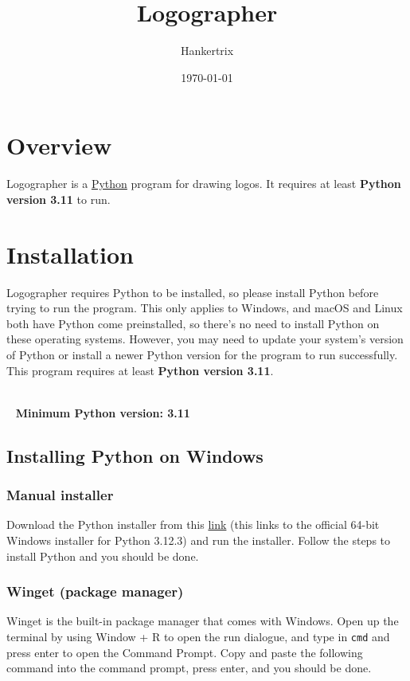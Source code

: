 \documentclass[11pt]{article}
\author{Hankertrix}
\date{\today}
\title{Logographer}
\begin{document}
\maketitle
\setcounter{tocdepth}{2}
\tableofcontents \clearpage
\section{Overview}
\label{sec:org5a114f2}
Logographer is a \href{https://www.python.org/}{Python} program for drawing logos. It requires at least \textbf{Python version 3.11} to run.

\section{Installation}
\label{sec:org0b1c435}
Logographer requires Python to be installed, so please install Python before trying to run the program. This only applies to Windows, and macOS and Linux both have Python come preinstalled, so there's no need to install Python on these operating systems. However, you may need to update your system's version of Python or install a newer Python version for the program to run successfully. This program requires at least \textbf{Python version 3.11}.

 ~\\~  \textbf{Minimum Python version: 3.11}

\subsection{Installing Python on Windows}
\label{sec:org8801029}

\subsubsection{Manual installer}
\label{sec:org24dece9}
Download the Python installer from this \href{https://www.python.org/ftp/python/3.12.3/python-3.12.3-amd64.exe}{link} (this links to the official 64-bit Windows installer for Python 3.12.3) and run the installer. Follow the steps to install Python and you should be done.

\subsubsection{Winget (package manager)}
\label{sec:org0443ec8}
Winget is the built-in package manager that comes with Windows. Open up the terminal by using Window + R to open the run dialogue, and type in \texttt{cmd} and press enter to open the Command Prompt. Copy and paste the following command into the command prompt, press enter, and you should be done.
\end{document}
